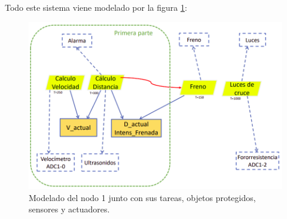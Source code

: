 Todo este sistema viene modelado por la figura \ref{fig:node1}:

\begin{figure}[H]
  \centering
  \includegraphics[width=.8\linewidth]{pictures/node1.png}
  \caption{Modelado del nodo 1 junto con sus tareas, objetos protegidos, sensores y actuadores.}
  \label{fig:node1}
\end{figure}